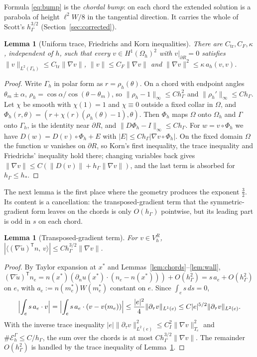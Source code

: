 \documentclass[pdflatex,sn-mathphys-num]{sn-jnl}
\theoremstyle{thmstyleone}
\newtheorem{lemma}[theorem]{Lemma}
\theoremstyle{thmstylethree}
\newcommand{\hG}{h_\Gamma}
\newcommand{\Gh}{\Gamma_h}
\newcommand{\Oh}{\Omega_h}
\newcommand{\EG}{\mathcal E_h^\Gamma}
\newcommand{\VR}{V_h^R}
\newcommand{\dn}{\partial_n}
\newcommand{\dt}{\partial_\tau}
\newcommand{\ut}{\tilde u}
\newcommand{\ip}[2]{\langle #1,\, #2\rangle}
\newcommand{\norm}[1]{\lVert #1\rVert}
\begin{document}
Formula \eqref{eq:bump} is the \emph{chordal bump}: on each chord the extended solution is a parabola of height $\ell^2W/8$ in the tangential direction. It carries the whole of Scott's $\hG^{3/2}$ (Section~\ref{sec:corrected}).

\begin{lemma}[Uniform trace, Friedrichs and Korn inequalities]\label{lem:korn}
There are $C_{\mathrm{tr}},C_F,\kappa$, independent of $h$, such that every $v\in H^1(\Oh)^2$ with $v|_{\partial R}=0$ satisfies
$\norm{v}_{L^2(\Gh)}\le C_{\mathrm{tr}}\norm{\nabla v}$, $\norm{v}\le C_F\norm{\nabla v}$ and $\norm{\nabla v}^2\le\kappa\,a_h(v,v)$.
\end{lemma}

\begin{proof}
Write $\Gh$ in polar form as $r=\rho_h(\theta)$. On a chord with endpoint angles $\theta_m\pm\alpha$, $\rho_h=\cos\alpha/\cos(\theta-\theta_m)$, so $\norm{\rho_h-1}_\infty\le C\hG^2$ and $\norm{\rho_h'}_\infty\le C\hG$. Let $\chi$ be smooth with $\chi(1)=1$ and $\chi\equiv0$ outside a fixed collar in $\Omega$, and $\Phi_h(r,\theta)=(r+\chi(r)(\rho_h(\theta)-1),\theta)$. Then $\Phi_h$ maps $\Omega$ onto $\Oh$ and $\Gamma$ onto $\Gh$, is the identity near $\partial R$, and $\norm{D\Phi_h-I}_\infty\le C\hG$. For $w=v\circ\Phi_h$ we have $D(w)=D(v)\circ\Phi_h+E$ with $|E|\le C\hG|\nabla v\circ\Phi_h|$. On the fixed domain $\Omega$ the function $w$ vanishes on $\partial R$, so Korn's first inequality, the trace inequality and Friedrichs' inequality hold there; changing variables back gives $\norm{\nabla v}\le C(\norm{D(v)}+\hG\norm{\nabla v})$, and the last term is absorbed for $\hG\le h_\ast$.
\end{proof}

The next lemma is the first place where the geometry produces the exponent $\frac32$. Its content is a cancellation: the transposed-gradient term that the symmetric-gradient form leaves on the chords is only $O(\hG)$ pointwise, but its leading part is odd in $s$ on each chord.

\begin{lemma}[Transposed-gradient term]\label{lem:transposed}
For $v\in\VR$, $|\ip{(\nabla\ut)^{\mathsf T}n}{v}|\le C\hG^{3/2}\norm{\nabla v}$.
\end{lemma}

\begin{proof}
By Taylor expansion at $x^\ast$ and Lemmas~\ref{lem:chords}--\ref{lem:wall}, $(\nabla\ut)^{\mathsf T}n_e=n(x^\ast)(\dn u(x^\ast)\cdot(n_e-n(x^\ast)))+O(\hG^2)=s\,a_e+O(\hG^2)$ on $e$, with $a_e:=n(m_e^\ast)W(m_e^\ast)$ constant on $e$. Since $\int_es\,ds=0$,
\[
\Bigl|\int_es\,a_e\cdot v\Bigr|=\Bigl|\int_es\,a_e\cdot(v-v(m_e))\Bigr|\le\frac{|e|^2}{4}\norm{\dt v}_{L^1(e)}\le C|e|^{5/2}\norm{\dt v}_{L^2(e)} .
\]
With the inverse trace inequality $|e|\norm{\dt v}_{L^2(e)}^2\le C_I^2\norm{\nabla v}^2_{T_e}$ and $\#\EG\le C/\hG$, the sum over the chords is at most $C\hG^{3/2}\norm{\nabla v}$. The remainder $O(\hG^2)$ is handled by the trace inequality of Lemma~\ref{lem:korn}.
\end{proof}
\end{document}
